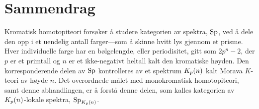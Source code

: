 




\newpage 
\section*{Sammendrag}

Kromatisk homotopiteori forsøker å studere kategorien av spektra, $\mathrm{Sp}$, ved å dele den opp i et uendelig antall farger---som å skinne hvitt lys gjennom et prisme. Hver individuelle farge har en bølgelengde, eller periodisitet, gitt som $2p^n-2$, der $p$ er et primtall og $n$ er et ikke-negativt heltall kalt den kromatiske høyden. Den korresponderende delen av $\mathrm{Sp}$ kontrolleres av et spektrum ${K_p(n)}$ kalt Morava $K$-teori av høyde $n$. Det overordnede målet med monokromatisk homotopiteori, samt denne abhandlingen, er å forstå denne delen, som kalles kategorien av ${K_p(n)}$-lokale spektra, $\mathrm{Sp}_{K_p(n)}$. 

